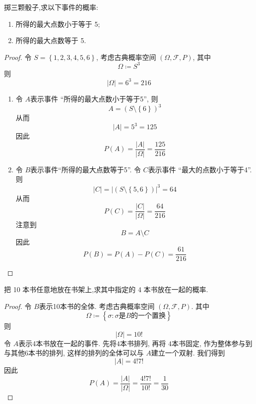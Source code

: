 \documentclass[../main.tex]{subfiles}
\begin{document}
\begin{exercise}{}{}
掷三颗骰子,求以下事件的概率:
\begin{enumerate}
    \item 所得的最大点数小于等于 5;
    \item 所得的最大点数等于 5.
\end{enumerate}
\end{exercise}
\begin{proof}
    令 \(  S= \left\{ 1,2,3,4,5,6 \right\}  \), 考虑古典概率空间 \(  \left(  \Omega ,\mathcal{F},P \right)   \), 其中 \[
     \Omega \coloneqq S^{3}
    \]  则 \[
    \left|  \Omega  \right|= 6^{3}= 216 
    \]
\begin{enumerate}
    \item 令 \(  A  \)表示事件 ``所得的最大点数小于等于5'', 则 \[
    A= \left( S\setminus \left\{ 6 \right\} \right)^{3} 
    \]从而 \[
    \left| A \right|= 5^{3}=  125
    \] 因此 \[
    P\left( A \right)= \frac{\left| A \right|  }{\left|  \Omega  \right|  }= \frac{125 }{216 }   
    \]
    \item 令 \(  B  \)表示事件``所得的最大点数等于5''. 令 \(  C \)表示事件 ``最大的点数小于等于4''. 则 \[
    \left| C \right|= \left| \left( S\setminus \left\{ 5,6 \right\} \right) \right| ^{3}  = 64
    \]从而 \[
    P\left( C \right)= \frac{\left| C \right|  }{\left|  \Omega  \right|  }= \frac{64 }{216 }   
    \] 注意到\[
    B= A\setminus C
    \]因此 \[
    P\left( B \right)= P\left( A \right)-P\left( C \right)= \frac{61 }{216 }    
    \]
\end{enumerate}

\end{proof}
\begin{exercise}{}{}
把 10 本书任意地放在书架上,求其中指定的 4 本书放在一起的概率.
\end{exercise}
\begin{proof}
    令 \(  B  \)表示10本书的全体. 考虑古典概率空间 \(  \left(  \Omega ,\mathcal{F},P \right)   \). 其中 \[
     \Omega \coloneqq \left\{  \sigma :  \sigma \text{是} B\text{的一个置换} \right\}
    \]  则 \[
    \left|  \Omega  \right|=  10!
    \]令 \(  A  \)表示4本书放在一起的事件. 先将\(  4  \)本书排列, 再将 \(  4  \)本书固定, 作为整体参与到与其他6本书的排列, 这样的排列的全体可以与 \(  A  \)建立一个双射. 我们得到    \[
    \left| A \right|= 4! 7! 
    \]因此 \[
    P\left( A \right)= \frac{\left| A \right|  }{\left|  \Omega  \right|  }= \frac{4!7! }{10! }=    \frac{1 }{30 } 
    \]   
\end{proof}
\end{document}
